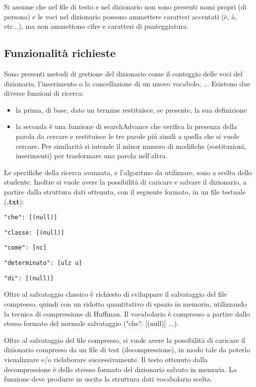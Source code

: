 \documentclass[paper=a4, fontsize=11pt,twoside]{scrartcl}   %
\begin{document}
				Si assume che nel file di testo e nel dizionario non sono presenti nomi propri (di persona) e le voci nel dizionario possono ammettere caratteri accentati (è, à, etc...), ma non ammettono cifre e caratteri di punteggiatura.
			
			\subsection{Funzionalità richieste}
				Sono presenti metodi di gestione del dizionario come il conteggio delle voci del dizionario, l'inserimento o la cancellazione di un nuovo vocabolo, ...				
				Esistono due diverse funzioni di ricerca:
				\begin{itemize}
					\item la prima, di base, dato un termine restituisce, se presente, la sua definizione
					\item la seconda è una funzione di searchAdvance che verifica la presenza della parola da cercare e restituisce le tre parole più simili a quella che si vuole cercare. Per similarità si intende il minor numero di modifiche (sostituzioni, inserimenti) per trasformare una parola nell'altra.
				\end{itemize} \pagebreak
				 Le specifiche della ricerca avanzata, e l'algoritmo da utilizzare, sono a scelta dello studente. Inoltre si vuole avere la possibilità di caricare e salvare il dizionario, a partire dalla struttura dati ottenuta, con il seguente formato, in un file testuale (\textbf{.txt}):
				 \begin{trivlist}
				 	\item \texttt{"che": [(null)]}
				 	\item \texttt{"classe: [(null)]}
				 	\item \texttt{"come": [nc]}
				 	\item \texttt{"determinato": [ulz u]}
				 	\item \texttt{"di": [(null)]}
				 \end{trivlist}
			 	 Oltre al salvataggio classico è richiesto di sviluppare il salvataggio del file compresso, quindi con un ridotto quantitativo di spazio in memoria, utilizzando la tecnica di compressione di Huffman. Il vocabolario è compresso a partire dallo stesso formato del normale salvataggio ("che": [(null)] ...). 
			 	 
			 	 Oltre al salvataggio del file compresso, si vuole avere la possibilità di caricare il dizionario compresso da un file di test (decompressione), in modo tale da poterlo visualizzare e/o rielaborare successivamente. Il testo ottenuto dalla decompressione è dello stresso formato del dizionario salvato in memoria. La funzione deve produrre in uscita la struttura dati vocabolario scelta.
			 	 \newpage
\end{document}
